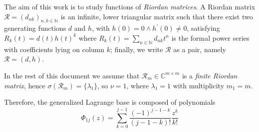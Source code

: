 The aim of this work is to study functions of \emph{Riordan matrices}. A Riordan matrix 
$\mathcal{R}=(d_{nk})_{n,k\in\mathbb{N}}$ is an infinite, lower triangular matrix
such that there exist two generating functions $d$ and $h$, with $h(0)=0 \wedge h^{\prime}(0)\neq0$, satisfying
$R_{k}(t) = d(t)h(t)^{k}$
where $R_{k}(t) = \sum_{n\in\mathbb{N}}{d_{nk}t^{n}}$ is the formal power series with coefficients lying 
on column $k$; finally, we write $\mathcal{R}$ as a pair, namely $\mathcal{R}=(d, h)$. 

In the rest of this document we assume that $\mathcal{R}_{m}\in\mathbb{C}^{m\times m}$ is a \emph{finite Riordan matrix}, 
hence $\sigma(\mathcal{R}_{m})= \lbrace \lambda_{1} \rbrace$, so $\nu=1$, where $\lambda_{1}=1$ 
with multiplicity $m_{1}=m$. 


Therefore, the generalized Lagrange base is composed of polynomials
\begin{displaymath}
  \Phi_{1j}(z) = \sum_{k=0}^{j-1}{\frac{(-1)^{j-1-k}}{(j-1-k)!}\frac{z^{k}}{k!}}
\end{displaymath}


